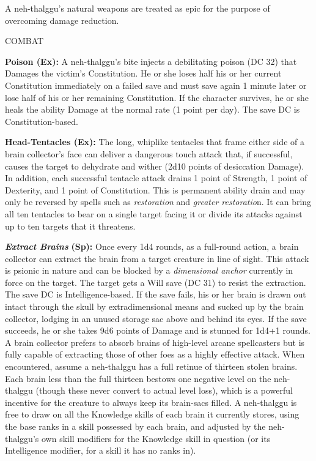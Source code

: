 \documentclass{article}
\begin{document}
{A neh-thalggu's natural weapons are treated as epic for the purpose of overcoming 
damage reduction.

COMBAT 

\textbf{Poison (Ex):} A neh-thalggu's bite injects a debilitating poison (DC 32) 
that Damages the victim's Constitution. He or she loses half his or her current 
Constitution immediately on a failed save and must save again 1 minute later or 
lose half of his or her remaining Constitution. If the character survives, he or 
she heals the ability Damage at the normal rate (1 point per day). The save DC 
is Constitution-based.

\textbf{Head-Tentacles (Ex): }The long, whiplike tentacles that frame either side 
of a brain collector's face can deliver a dangerous touch attack that, if successful, 
causes the target to dehydrate and wither (2d10 points of desiccation Damage). 
In addition, each successful tentacle attack drains 1 point of Strength, 1 point 
of Dexterity, and 1 point of Constitution. This is permanent ability drain and 
may only be reversed by spells such as \textit{restoration }and \textit{greater 
restoratio}n. It can bring all ten tentacles to bear on a single target facing 
it or divide its attacks against up to ten targets that it threatens. 

\textit{\textbf{Extract Brains }}\textbf{(Sp):} Once every 1d4 rounds, as a full-round 
action, a brain collector can extract the brain from a target creature in line 
of sight. This attack is psionic in nature and can be blocked by a \textit{dimensional 
anchor }currently in force on the target. The target gets a Will save (DC 31) to 
resist the extraction. The save DC is Intelligence-based. If the save fails, his 
or her brain is drawn out intact through the skull by extradimensional means and 
sucked up by the brain collector, lodging in an unused storage sac above and behind 
its eyes. If the save succeeds, he or she takes 9d6 points of Damage and is stunned 
for 1d4+1 rounds. A brain collector prefers to absorb brains of high-level arcane 
spellcasters but is fully capable of extracting those of other foes as a highly 
effective attack. When encountered, assume a neh-thalggu has a full retinue of 
thirteen stolen brains. Each brain less than the full thirteen bestows one negative 
level on the neh-thalggu (though these never convert to actual level loss), which 
is a powerful incentive for the creature to always keep its brain-sacs filled. 
A neh-thalggu is free to draw on all the Knowledge skills of each brain it currently 
stores, using the base ranks in a skill possessed by each brain, and adjusted by 
the neh-thalggu's own skill modifiers for the Knowledge skill in question (or its 
Intelligence modifier, for a skill it has no ranks in). 

}
\end{document}
